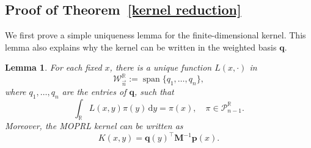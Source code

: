 \documentclass[a4paper,10pt,leqno]{amsart}
\numberwithin{equation}{section}
\newtheorem{lemma}[theorem]{Lemma}
\theoremstyle{remark}
\newcommand{\dd}{\mathrm{d}}
\begin{document}

\subsection{Proof of Theorem~\ref{kernel reduction}}
\label{Proof of Kernel MOPRL}

We first prove a simple uniqueness lemma for the finite-dimensional kernel. This lemma also explains why the kernel can be written in the weighted basis $\bm q$.

\begin{lemma}\label{lem:kernel uniqueness}
For each fixed $x$, there is a unique function $L(x,\cdot)$ in
\begin{equation}
    \mathcal W_{\vec n}^{\mathbb R}:=\operatorname{span}\{q_1,\ldots,q_n\},
\end{equation}
where $q_1,\ldots,q_n$ are the entries of $\bm q$, such that
\begin{equation}\label{kernel reproducing property}
    \int_{\mathbb R}L(x,y)\pi(y)\,\dd y=\pi(x),  \quad \pi\in\mathcal P_{n-1}^{\mathbb R}.
\end{equation}
Moreover, the MOPRL kernel can be written as
\begin{equation}\label{K=qMpinv}
    K(x,y)=\bm q(y)^\top\bm M^{-1}\bm p(x).
\end{equation}
\end{lemma}
\end{document}
